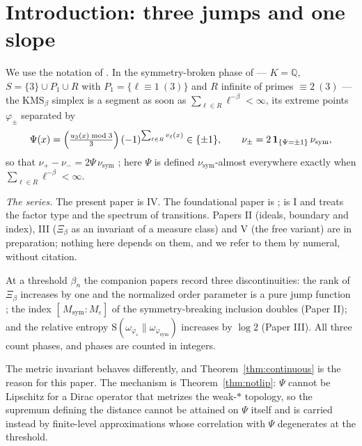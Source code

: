 \documentclass[11pt]{amsart}
\numberwithin{equation}{section}
\theoremstyle{definition}
\theoremstyle{remark}
\newcommand{\Q}{\mathbb{Q}}
\newcommand{\Ent}{\mathrm{S}}
\newcommand{\nusym}{\nu_{\mathrm{sym}}}
\newcommand{\phisym}{\varphi_{\mathrm{sym}}}
\newcommand{\Msym}{M_{\mathrm{sym}}}
\begin{document}
\maketitle

\tableofcontents

\section{Introduction: three jumps and one slope}

We use the notation of \cite{Main}. In the symmetry-broken phase of \cite[\S4.2]{Main} ---
$K=\Q$, $S=\{3\}\cup P_1\cup R$ with $P_1=\{\ell\equiv1\ (3)\}$ and $R$ infinite of primes
$\equiv2\ (3)$ --- the $\mathrm{KMS}_\beta$ simplex is a segment as soon as
$\sum_{\ell\in R}\ell^{-\beta}<\infty$, its extreme points $\varphi_\pm$ separated by
\begin{equation}\label{eq:Psi}
\Psi(x)=\Bigl(\tfrac{u_3(x)\bmod3}{3}\Bigr)\,(-1)^{\sum_{\ell\in R}v_\ell(x)}\in\{\pm1\},
\qquad
\nu_\pm=2\,\mathbf 1_{\{\Psi=\pm1\}}\,\nusym,
\end{equation}
so that $\nu_+-\nu_-=2\Psi\,\nusym$ \cite[Prop.~4.12]{Main}; here $\Psi$ is defined
$\nusym$-almost everywhere exactly when $\sum_{\ell\in R}\ell^{-\beta}<\infty$.

\emph{The series.} The present paper is IV. The foundational paper is \cite{Main};
\cite{SeriesI} is I and treats the factor type and the spectrum of transitions. Papers II
(ideals, boundary and index), III ($\Xi_\beta$ as an invariant of a measure class) and V
(the free variant) are in preparation; nothing here depends on them, and we refer to them
by numeral, without citation.

At a threshold $\beta_n$ the companion papers record three discontinuities: the rank of
$\Xi_\beta$ increases by one and the normalized order parameter is a pure jump function
\cite[Thm.~6.5]{SeriesI}; the index $[\,\Msym:M_\varepsilon]$ of the symmetry-breaking
inclusion doubles (Paper II); and the relative entropy
$\Ent(\omega_{\varphi_\varepsilon}\|\omega_{\phisym})$ increases by $\log2$ (Paper III).
All three count phases, and phases are counted in integers.

The metric invariant behaves differently, and Theorem~\ref{thm:continuous} is the reason for
this paper. The mechanism is Theorem~\ref{thm:notlip}: $\Psi$ cannot be Lipschitz for a
Dirac operator that metrizes the weak-$*$ topology, so the supremum defining the distance
cannot be attained on $\Psi$ itself and is carried instead by finite-level approximations
whose correlation with $\Psi$ degenerates at the threshold.
\end{document}
